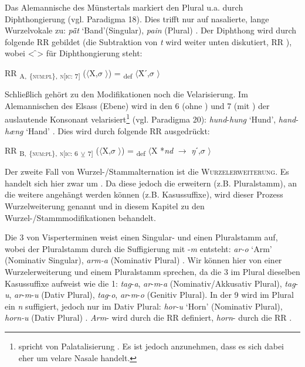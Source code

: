 Das Alemannische des Münstertals markiert den Plural u.a. durch Diphthongierung (vgl. Paradigma 18). Dies trifft nur auf nasalierte, lange Wurzelvokale zu: \textit{p\~{\=a}t} ‘Band’(Singular), \textit{pain} (Plural) \citep[43]{Mankel1886}. Der Diphthong wird durch folgende RR gebildet (die Subtraktion von \textit{t} wird weiter unten diskutiert, RR ), wobei < { ̑}> für Diphthongierung steht:

\ea%
\label{ex:key:52}
 RR \textsubscript{A,} \textsubscript{\{\textsc{num:pl}\},} \textsubscript{\textsc{n[}\textsc{ic:} 7]} ($\langle$X,$\sigma$ $\rangle$) = \textsubscript{def} $\langle$X̑ˊ,$\sigma$ $\rangle$\\
\z

Schließlich gehört zu den Modifikationen noch die Velarisierung. Im Alemannischen des Elsass (Ebene) wird in den  6 (ohne ) und 7 (mit ) der auslautende Konsonant velarisiert\footnote{\citet{Beyer1963} spricht von Palatalisierung \citep[63]{Beyer1963}. Es ist jedoch anzunehmen, dass es sich dabei eher um velare Nasale handelt.} (vgl. Paradigma 20): \textit{hund}-\textit{hung} ‘Hund’, \textit{hand}-\textit{hæng} ‘Hand’ \citep[63]{Beyer1963}. Dies wird durch folgende RR ausgedrückt:

\ea%
\label{ex:key:53}
 RR \textsubscript{B,} \textsubscript{\{\textsc{num:pl}\},} \textsubscript{\textsc{n[}\textsc{ic:} 6} \textsubscript{\tiny $\veebar$}\textsubscript{ 7]} ($\langle$X,$\sigma$ $\rangle$) = \textsubscript{def} $\langle$X *\textit{nd} $\rightarrow$ \textit{ŋ}ˊ,$\sigma$ $\rangle$ \\
\z

Der zweite Fall von Wur\-zel-/Stamm\-al\-ter\-na\-tion ist die \textsc{Wurzelerweiterung}. Es handelt sich hier zwar um . Da diese  jedoch die  erweitern (z.B. Pluralstamm), an die weitere  angehängt werden können (z.B. Kasussuffixe), wird dieser Prozess Wurzelweiterung genannt und in diesem Kapitel zu den Wur\-zel-/Stamm\-mo\-di\-fi\-ka\-tio\-nen behandelt.

Die  3 von Visperterminen weist einen Singular- und einen Pluralstamm auf, wobei der Pluralstamm durch die Suffigierung mit -\textit{m} entsteht: \textit{ar-o} ‘Arm’ (Nominativ Singular), \textit{arm-a} (Nominativ Plural) \citep[122]{Wipf1911}. Wir können hier von einer Wurzelerweiterung und einem Pluralstamm sprechen, da die  3 im Plural dieselben Kasussuffixe aufweist wie die  1: \textit{tag}-\textit{a}, \textit{ar}-\textit{m}-\textit{a} (Nominativ/Akkusativ Plural), \textit{tag}-\textit{u}, \textit{ar}-\textit{m}-\textit{u} (Dativ Plural), \textit{tag}-\textit{o}, \textit{ar}-\textit{m}-\textit{o} (Genitiv Plural). In der  9 wird im Plural ein \textit{n} suffigiert, jedoch nur im Dativ Plural: \textit{hor-u} ‘Horn’ (Nominativ Plural), \textit{horn-u} (Dativ Plural) \citep[130]{Wipf1911}. \textit{Arm}- wird durch die RR  definiert, \textit{horn}- durch die RR .

